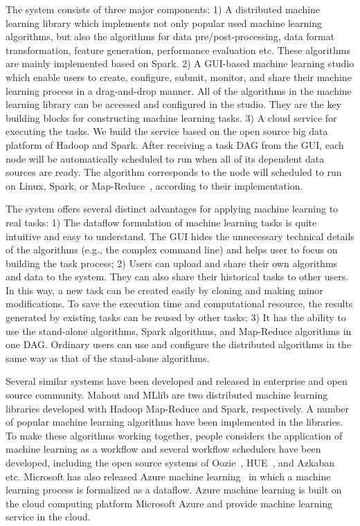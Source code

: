 \documentclass{sig-alternate-05-2015}
\begin{document}
The system consists of three major components: 1) A distributed machine learning library which implements not only popular used machine learning algorithms, but also the algorithms for data pre/post-processing, data format transformation, feature generation, performance evaluation etc. These algorithms are mainly implemented based on Spark.  2) A GUI-based machine learning studio which enable users to create, configure, submit, monitor, and share their machine learning process in a drag-and-drop manner. All of the algorithms in the machine learning library can be accessed and configured in the studio. They are the key building blocks for constructing machine learning tasks. 3) A cloud service for executing the tasks. We build the service based on the open source big data platform of Hadoop and Spark. After receiving a task DAG from the GUI, each node will be automatically scheduled to run when all of its dependent data sources are ready. The algorithm corresponds to the node will scheduled to run on Linux, Spark, or Map-Reduce~\cite{dean2004mapreduce,dean2010mapreduce}, according to their implementation.

The system offers several distinct advantages for applying machine learning to real tasks: 1) The dataflow formulation of machine learning tasks is quite intuitive and easy to understand. The GUI hides the unnecessary technical details of the algorithms (e.g., the complex command line) and helps user to focus on building the task process; 2) Users can upload and share their own algorithms and data to the system. They can also share their historical tasks to other users. In this way, a new task can be created easily by cloning and making minor modifications. To save the execution time and computational resource, the results generated by existing tasks can be reused by other tasks; 3) It has the ability to use the stand-alone algorithms, Spark algorithms, and Map-Reduce algorithms in one DAG. Ordinary users can use and configure the distributed algorithms in the same way as that of the stand-alone algorithms.

Several similar systems have been developed and released in enterprise and open source community. Mahout and MLlib are two distributed machine learning libraries developed with Hadoop Map-Reduce and Spark, respectively. A number of popular machine learning algorithms have been implemented in the libraries. To make these algorithms working together, people considers the application of machine learning as a workflow and several workflow schedulers have been developed, including the open source systems of Oozie~\cite{islam2012oozie,Oozie}, HUE~\cite{HUE}, and Azkaban~\cite{Azkaban} etc. Microsoft has also released Azure machine learning~\cite{barga2014introducing,AzureML} in which a machine learning process is formalized as a dataflow. Azure machine learning is built on the cloud computing platform Microsoft Azure and provide machine learning service in the cloud.
\end{document}
